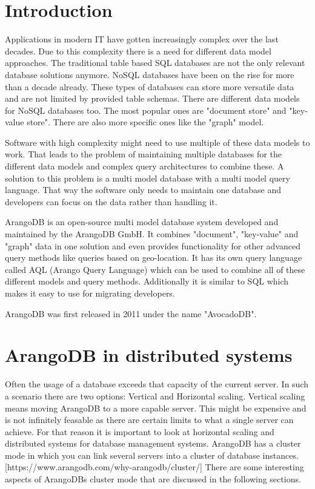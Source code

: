 
\section{Introduction}
Applications in modern IT have gotten increasingly complex over the last decades. Due to this complexity there is a need for different data model approaches. The traditional table based SQL databases are not the only relevant database solutions anymore. NoSQL databases have been on the rise for more than a decade already. These types of databases can store more versatile data and are not limited by provided table schemas. There are different data models for NoSQL databases too. The most popular ones are "document store" and "key-value store". There are also more specific ones like the "graph" model.

Software with high complexity might need to use multiple of these data models to work. That leads to the problem of maintaining multiple databases for the different data models and complex query architectures to combine these. A solution to this problem is a multi model database with a multi model query language. That way the software only needs to maintain one database and developers can focus on the data rather than handling it.

ArangoDB is an open-source multi model database system developed and maintained by the ArangoDB GmbH. It combines "document", "key-value" and "graph" data in one solution and even provides functionality for other advanced query methods like queries based on geo-location. It has its own query language called AQL (Arango Query Language) which can be used to combine all of these different models and query methods. Additionally it is similar to SQL which makes it easy to use for migrating developers.

ArangoDB was first released in 2011 under the name "AvocadoDB". 

\parencite{ArangoHomepage}

\section{ArangoDB in distributed systems}
Often the usage of a database exceeds that capacity of the current server. In such a scenario there are two options: Vertical and Horizontal scaling. Vertical scaling means moving ArangoDB to a more capable server. This might be expensive and is not infinitely feasable as there are certain limits to what a single server can achieve. For that reason it is important to look at horizontal scaling and distributed systems for database management systems. ArangoDB has a cluster mode in which you can link several servers into a cluster of database instances. [https://www.arangodb.com/why-arangodb/cluster/] There are some interesting aspects of ArangoDBs cluster mode that are discussed in the following sections.


